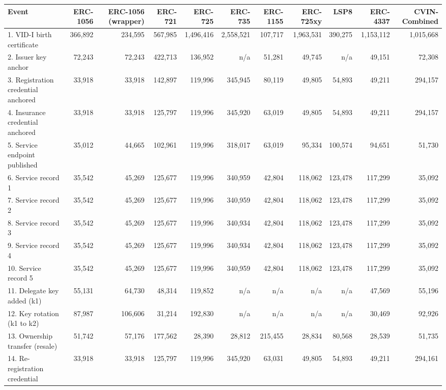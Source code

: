 \begin{table}[ht]
\centering
\small
\begin{tabular}{lrrrrrrrrrr}
\toprule
Event & ERC-1056 & ERC-1056 (wrapper) & ERC-721 & ERC-725 & ERC-735 & ERC-1155 & ERC-725xy & LSP8 & ERC-4337 & CVIN-Combined \\
\midrule
1. VID-I birth certificate & 366,892 & 234,595 & 567,985 & 1,496,416 & 2,558,521 & 107,717 & 1,963,531 & 390,275 & 1,153,112 & 1,015,668 \\
2. Issuer key anchor & 72,243 & 72,243 & 422,713 & 136,952 & n/a & 51,281 & 49,745 & n/a & 49,151 & 72,308 \\
3. Registration credential anchored & 33,918 & 33,918 & 142,897 & 119,996 & 345,945 & 80,119 & 49,805 & 54,893 & 49,211 & 294,157 \\
4. Insurance credential anchored & 33,918 & 33,918 & 125,797 & 119,996 & 345,920 & 63,019 & 49,805 & 54,893 & 49,211 & 294,157 \\
5. Service endpoint published & 35,012 & 44,665 & 102,961 & 119,996 & 318,017 & 63,019 & 95,334 & 100,574 & 94,651 & 51,730 \\
6. Service record 1 & 35,542 & 45,269 & 125,677 & 119,996 & 340,959 & 42,804 & 118,062 & 123,478 & 117,299 & 35,092 \\
7. Service record 2 & 35,542 & 45,269 & 125,677 & 119,996 & 340,959 & 42,804 & 118,062 & 123,478 & 117,299 & 35,092 \\
8. Service record 3 & 35,542 & 45,269 & 125,677 & 119,996 & 340,934 & 42,804 & 118,062 & 123,478 & 117,299 & 35,092 \\
9. Service record 4 & 35,542 & 45,269 & 125,677 & 119,996 & 340,934 & 42,804 & 118,062 & 123,478 & 117,299 & 35,092 \\
10. Service record 5 & 35,542 & 45,269 & 125,677 & 119,996 & 340,959 & 42,804 & 118,062 & 123,478 & 117,299 & 35,092 \\
11. Delegate key added (k1) & 55,131 & 64,730 & 48,314 & 119,852 & n/a & n/a & n/a & n/a & 47,569 & 55,196 \\
12. Key rotation (k1 to k2) & 87,987 & 106,606 & 31,214 & 192,830 & n/a & n/a & n/a & n/a & 30,469 & 92,926 \\
13. Ownership transfer (resale) & 51,742 & 57,176 & 177,562 & 28,390 & 28,812 & 215,455 & 28,834 & 80,568 & 28,539 & 51,735 \\
14. Re-registration credential & 33,918 & 33,918 & 125,797 & 119,996 & 345,920 & 63,031 & 49,805 & 54,893 & 49,211 & 294,161 \\

\end{tabular}
\end{table}
